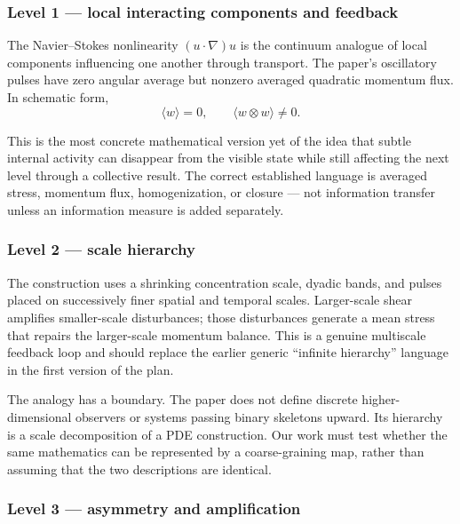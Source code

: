 \documentclass[11pt]{article}
\theoremstyle{definition}
\theoremstyle{plain}
\theoremstyle{remark}
\begin{document}
\subsubsection*{Level 1 --- local interacting components and feedback}

The Navier--Stokes nonlinearity $(u\cdot\nabla)u$ is the continuum analogue of local components influencing one another through transport. The paper's oscillatory pulses have zero angular average but nonzero averaged quadratic momentum flux. In schematic form,
\begin{equation}
  \langle w\rangle=0,
  \qquad
  \langle w\otimes w\rangle\ne0.
  \label{eq:zero-mean-stress}
\end{equation}

This is the most concrete mathematical version yet of the idea that subtle internal activity can disappear from the visible state while still affecting the next level through a collective result. The correct established language is averaged stress, momentum flux, homogenization, or closure --- not information transfer unless an information measure is added separately.

\subsubsection*{Level 2 --- scale hierarchy}

The construction uses a shrinking concentration scale, dyadic bands, and pulses placed on successively finer spatial and temporal scales. Larger-scale shear amplifies smaller-scale disturbances; those disturbances generate a mean stress that repairs the larger-scale momentum balance. This is a genuine multiscale feedback loop and should replace the earlier generic ``infinite hierarchy'' language in the first version of the plan.

The analogy has a boundary. The paper does not define discrete higher-dimensional observers or systems passing binary skeletons upward. Its hierarchy is a scale decomposition of a PDE construction. Our work must test whether the same mathematics can be represented by a coarse-graining map, rather than assuming that the two descriptions are identical.

\subsubsection*{Level 3 --- asymmetry and amplification}
\end{document}
